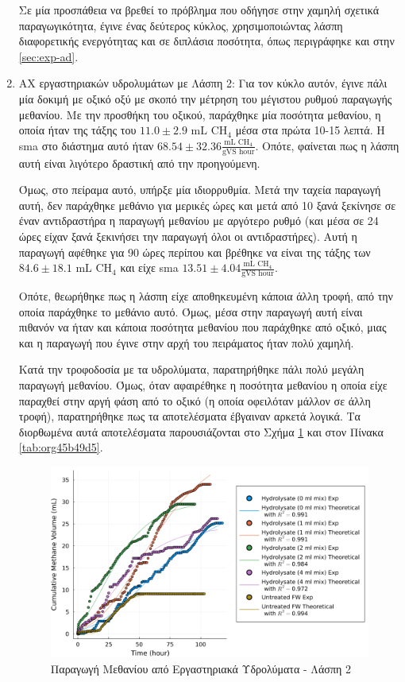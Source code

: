 \documentclass[11pt]{report}
\begin{document}
\begin{enumerate}
Σε μία προσπάθεια να βρεθεί το πρόβλημα που οδήγησε στην χαμηλή σχετικά παραγωγικότητα, έγινε ένας δεύτερος κύκλος, χρησιμοποιώντας λάσπη διαφορετικής ενεργότητας και σε διπλάσια ποσότητα, όπως περιγράφηκε και στην \autoref{sec:exp-ad}.

\item ΑΧ εργαστηριακών υδρολυμάτων με Λάσπη 2:
\label{sec:org0564ffe}
Για τον κύκλο αυτόν, έγινε πάλι μία δοκιμή με οξικό οξύ με σκοπό την μέτρηση του μέγιστου ρυθμού παραγωγής μεθανίου. Με την προσθήκη του οξικού, παράχθηκε μία ποσότητα μεθανίου, η οποία ήταν της τάξης του \(11.0 \pm 2.9 \text{ mL CH$_4$}\) μέσα στα πρώτα 10-15 λεπτά. H \acrshort{sma} στο διάστημα αυτό ήταν \(68.54 \pm 32.36 \frac{\text{mL CH$_4$}}{\text{gVS hour}}\). Οπότε, φαίνεται πως η λάσπη αυτή είναι λιγότερο δραστική από την προηγούμενη.

Όμως, στο πείραμα αυτό, υπήρξε μία ιδιορρυθμία. Μετά την ταχεία παραγωγή αυτή, δεν παράχθηκε μεθάνιο για μερικές ώρες και μετά από 10 ξανά ξεκίνησε σε έναν αντιδραστήρα η παραγωγή μεθανίου με αργότερο ρυθμό (και μέσα σε 24 ώρες είχαν ξανά ξεκινήσει την παραγωγή όλοι οι αντιδραστήρες). Αυτή η παραγωγή αφέθηκε για 90 ώρες περίπου και βρέθηκε να είναι της τάξης των \(84.6 \pm 18.1 \text{ mL CH$_4$}\) και είχε \acrshort{sma} \(13.51 \pm 4.04 \frac{\text{mL CH$_4$}}{\text{gVS hour}}\).

Οπότε, θεωρήθηκε πως η λάσπη είχε αποθηκευμένη κάποια άλλη τροφή, από την οποία παράχθηκε το μεθάνιο αυτό. Όμως, μέσα στην παραγωγή αυτή είναι πιθανόν να ήταν και κάποια ποσότητα μεθανίου που παράχθηκε από οξικό, μιας και η παραγωγή που έγινε στην αρχή του πειράματος ήταν πολύ χαμηλή.

Κατά την τροφοδοσία με τα υδρολύματα, παρατηρήθηκε πάλι πολύ μεγάλη παραγωγή μεθανίου. Όμως, όταν αφαιρέθηκε η ποσότητα μεθανίου η οποία είχε παραχθεί στην αργή φάση από το οξικό (η οποία οφειλόταν μάλλον σε άλλη τροφή), παρατηρήθηκε πως τα αποτελέσματα έβγαιναν αρκετά λογικά. Τα διορθωμένα αυτά αποτελέσματα παρουσιάζονται στο Σχήμα \ref{fig:org688b558} και στον Πίνακα \ref{tab:org45b49d5}.

\begin{figure}[htbp]
\centering
\includegraphics[width=.9\linewidth]{../plots/BMPs/methane_s2_r1_comp.png}
\caption{\label{fig:org688b558}Παραγωγή Μεθανίου από Εργαστηριακά Υδρολύματα - Λάσπη 2}
\end{figure}


\end{enumerate}
\end{document}
